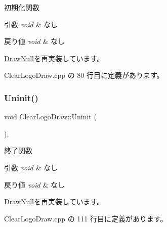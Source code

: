 初期化関数 


\begin{DoxyParams}{引数}
{\em void} & なし \\
\hline
\end{DoxyParams}

\begin{DoxyRetVals}{戻り値}
{\em void} & なし \\
\hline
\end{DoxyRetVals}


\mbox{\hyperlink{class_draw_null_a20aef1e54c1a158b741bfd731e18efdf}{Draw\+Null}}を再実装しています。



 Clear\+Logo\+Draw.\+cpp の 80 行目に定義があります。

\mbox{\label{class_clear_logo_draw_aa73db5b701e644f8e552ddb254a0a9aa}} 
\subsubsection{\texorpdfstring{Uninit()}{Uninit()}}
{\footnotesize\ttfamily void Clear\+Logo\+Draw\+::\+Uninit (\begin{DoxyParamCaption}{ }\end{DoxyParamCaption})\hspace{0.3cm}{\ttfamily [override]}, {\ttfamily [virtual]}}



終了関数 


\begin{DoxyParams}{引数}
{\em void} & なし \\
\hline
\end{DoxyParams}

\begin{DoxyRetVals}{戻り値}
{\em void} & なし \\
\hline
\end{DoxyRetVals}


\mbox{\hyperlink{class_draw_null_a6e81d63efab7333e8d0e8af99362a4d9}{Draw\+Null}}を再実装しています。



 Clear\+Logo\+Draw.\+cpp の 111 行目に定義があります。

\mbox{\label{class_clear_logo_draw_a2253a9252d9ba6e23602379404ec92fc}} 
